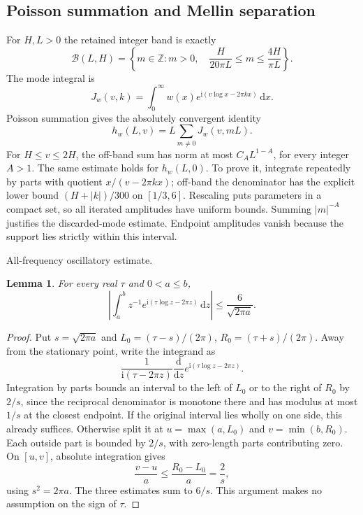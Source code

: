 \documentclass[11pt,a4paper]{article}
\numberwithin{equation}{section}
\newtheorem{lemma}[theorem]{Lemma}
\theoremstyle{definition}
\newcommand{\Z}{\mathbb Z}
\newcommand{\dd}{\,\mathrm d}
\newcommand{\ii}{\mathrm i}
\begin{document}
\subsection{Poisson summation and Mellin separation}
For $H,L>0$ the retained integer band is exactly
\[
 \mathcal B(L,H)=\left\{m\in\Z:m>0,\quad
 \frac{H}{20\pi L}\le m\le\frac{4H}{\pi L}\right\}.
\]
The mode integral is
\[
 J_w(v,k)=\int_0^\infty w(x)e^{\ii(v\log x-2\pi kx)}\dd x.
\]
Poisson summation gives the absolutely convergent identity
\[
 h_w(L,v)=L\sum_{m\ne0}J_w(v,mL).
\]
For $H\le v\le2H$, the off-band sum has norm at most $C_A L^{1-A}$,
for every integer $A>1$. The same estimate holds for $h_w(L,0)$.
To prove it, integrate repeatedly by parts with quotient
$x/(v-2\pi kx)$; off-band the denominator has the explicit lower bound
$(H+|k|)/300$ on $[1/3,6]$. Rescaling puts parameters in a compact set,
so all iterated amplitudes have uniform bounds. Summing
$|m|^{-A}$ justifies the discarded-mode estimate. Endpoint amplitudes vanish
because the support lies strictly within this interval.

\par\medskip\noindent All-frequency oscillatory estimate.
\begin{lemma}\label{lem:allfreq}
For every real $\tau$ and $0<a\le b$,
\[
 \left|\int_a^b z^{-1}e^{\ii(\tau\log z-2\pi z)}\dd z\right|
 \le\frac6{\sqrt{2\pi a}}.
\]
\end{lemma}
\begin{proof}
Put $s=\sqrt{2\pi a}$ and
$L_0=(\tau-s)/(2\pi)$, $R_0=(\tau+s)/(2\pi)$.
Away from the stationary point, write the integrand as
\[
 \frac1{\ii(\tau-2\pi z)}
 \frac{\mathrm d}{\mathrm dz}e^{\ii(\tau\log z-2\pi z)}.
\]
Integration by parts bounds an interval to the left of $L_0$ or to the right
of $R_0$ by $2/s$, since the reciprocal denominator is monotone there and
has modulus at most $1/s$ at the closest endpoint.
If the original interval lies wholly on one side, this already suffices.
Otherwise split it at $u=\max(a,L_0)$ and $v=\min(b,R_0)$. Each outside part
is bounded by $2/s$, with zero-length parts contributing zero. On $[u,v]$,
absolute integration gives
\[
 \frac{v-u}{a}\le\frac{R_0-L_0}{a}=\frac2s,
\]
using $s^2=2\pi a$. The three estimates sum to $6/s$.
This argument makes no assumption on the sign of $\tau$.
\end{proof}
\end{document}
